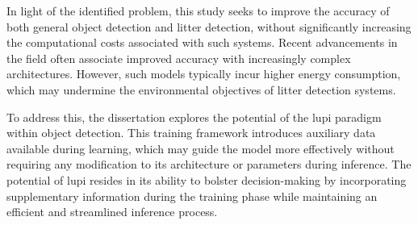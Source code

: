 
In light of the identified problem, this study seeks to improve the accuracy of both general object detection and litter detection, without significantly increasing the computational costs associated with such systems. Recent advancements in the field often associate improved accuracy with increasingly complex architectures. However, such models typically incur higher energy consumption, which may undermine the environmental objectives of litter detection systems.

To address this, the dissertation explores the potential of the \gls{lupi} paradigm within object detection. This training framework introduces auxiliary data available during learning, which may guide the model more effectively without requiring any modification to its architecture or parameters during inference. The potential of \gls{lupi} resides in its ability to bolster decision-making by incorporating supplementary information during the training phase while maintaining an efficient and streamlined inference process.

